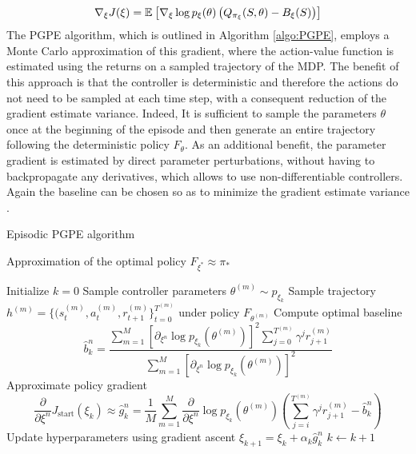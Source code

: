 \begin{equation}
	\nabla_\xi J(\xi) = \mathbb{E}_{}\left[ \nabla_\xi \log p_\xi(\theta) \left(Q_{\pi_\xi}(S,
						\theta) - B_\xi(S)\right) \right]
\end{equation}
The PGPE algorithm, which is outlined in Algorithm \ref{algo:PGPE}, employs a Monte Carlo approximation of this gradient, where the action-value function is estimated using the returns on a sampled trajectory of the MDP. The benefit of this approach is that the controller is deterministic and therefore the actions do not need to be sampled at each time step, with a consequent reduction of the gradient estimate variance. Indeed, It is sufficient to sample the parameters $\theta$ once at the beginning of the episode and then generate an entire trajectory following the deterministic policy $F_\theta$. As an additional benefit, the parameter gradient is
estimated by direct parameter perturbations, without having to backpropagate
any derivatives, which allows to use non-differentiable controllers. Again the baseline can be chosen so as to minimize the gradient estimate variance \cite{zhao2011analysis}.
\begin{algorithm}[t!]
	\caption{Episodic PGPE algorithm}
	\label{algo:PGPE}
	\begin{algorithmic}[0]
		\Ensure Approximation of the optimal policy $F_{\xi^*} \approx \pi_*$
		\begin{algorithmic}[1]
			\State Initialize $k = 0$
			\Repeat
					\State Sample controller parameters $\theta^{(m)} \sim p_{\xi_k}$ 
					\State Sample trajectory $h^{(m)} = \{(s_t^{(m)}, a_t^{(m)}, r_{t+1}^{(m)}\}_{t = 0}^{T^{(m)}}$ under policy $F_{\theta^{(m)}}$
				\EndFor
				\State Compute optimal baseline 
				\begin{equation}
					\widehat{b}_k^n = \frac{\sum^{M}_{m=1} \left[\partial_{\xi^n} \log p_{\xi_k} \left(\theta^{(m)}\right)\right]^2 \sum^{T^{(m)}}_{j=0} \gamma^j r_{j+1}^{(m)}}{\sum^{M}_{m=1} \left[\partial_{\xi^n} \log p_{\xi_k} \left(\theta^{(m)}\right)\right]^2}
				\end{equation}
				\State Approximate policy gradient
				\begin{equation}
					\frac{\partial}{\partial\xi^n} J_{\text{start}}(\xi_k) \approx \widehat{g}_k^n = \frac{1}{M} \sum^{M}_{m=1}
						\frac{\partial}{\partial\xi^n} \log p_{\xi_k}\left(\theta^{(m)}\right) \left( 
						\sum^{T^{(m)}}_{j=i} \gamma^j r_{j+1}^{(m)} - \widehat{b}_k^n \right)
				\end{equation}
				\State Update hyperparameters using gradient ascent $\xi_{k+1} = \xi_k + \alpha_k \widehat{g}_k^n$
				\State $k \leftarrow k + 1$
		\end{algorithmic}
	\end{algorithmic}
\end{algorithm}


